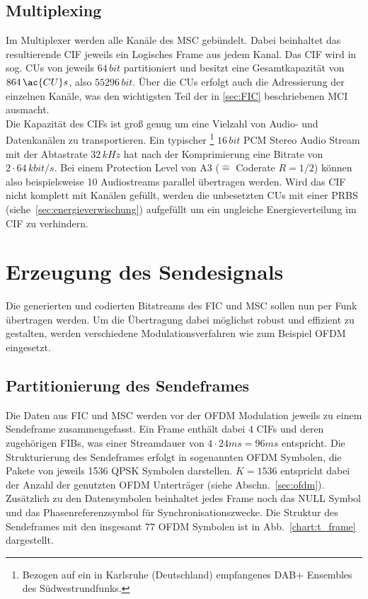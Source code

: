 \subsection{Multiplexing}
\label{sec:MUX}
Im Multiplexer werden alle Kanäle des MSC gebündelt. Dabei beinhaltet das resultierende \ac{CIF} jeweils ein Logisches Frame aus jedem Kanal. Das CIF wird in sog. \acp{CU} von jeweils $64 \, bit$ partitioniert und besitzt eine Gesamtkapazität von $864 \, \ac{CU}s$, also $55296 \, bit$. Über die \ac{CU}s erfolgt auch die Adressierung der einzelnen Kanäle, was den wichtigsten Teil der in \ref{sec:FIC} beschriebenen \ac{MCI} ausmacht.\\
Die Kapazität des CIFs ist groß genug um eine Vielzahl von Audio- und Datenkanälen zu transportieren.  Ein typischer \footnote{Bezogen auf ein in Karlsruhe (Deutschland) empfangenes DAB+ Ensembles des Südwestrundfunks.} $16 \, bit$ PCM Stereo Audio Stream mit der Abtastrate $32\, kHz$ hat nach der Komprimierung eine Bitrate von $2\cdot64\, kbit/s$. Bei einem Protection Level von A3 ($\hat{=}$ Coderate $R=1/2$) können also beispielsweise 10 Audiostreams parallel übertragen werden.
Wird das CIF nicht komplett mit Kanälen gefüllt, werden die unbesetzten CUs mit einer \ac{PRBS} (siehe~\ref{sec:energieverwischung}) aufgefüllt um ein ungleiche Energieverteilung im CIF zu verhindern.

\section{Erzeugung des Sendesignals}
\label{sec:ofdm_mod}
Die generierten und codierten Bitstreams des FIC und MSC sollen nun per Funk übertragen werden. Um die Übertragung dabei möglichst robust und effizient zu gestalten, werden verschiedene Modulationsverfahren wie zum Beispiel \ac{OFDM} eingesetzt.

\subsection{Partitionierung des Sendeframes}
\label{sec:transmission_frame}
Die Daten aus FIC und MSC werden vor der OFDM Modulation jeweils zu einem Sendeframe zusammengefasst. Ein Frame enthält dabei $4$ CIFs und deren zugehörigen FIBs, was einer Streamdauer von $4\cdot24ms = 96ms$ entspricht. Die Strukturierung des Sendeframes erfolgt in sogenannten OFDM Symbolen, die Pakete von jeweils 1536 QPSK Symbolen darstellen. $K=1536$ entspricht dabei der Anzahl der genutzten OFDM Unterträger (siehe Abschn.~\ref{sec:ofdm}). Zusätzlich zu den Datensymbolen beinhaltet jedes Frame noch das NULL Symbol und das Phasenreferenzsymbol für Synchronisationszwecke. Die Struktur des Sendeframes mit den insgesamt 77 OFDM Symbolen ist in Abb.~\ref{chart:t_frame} dargestellt.

